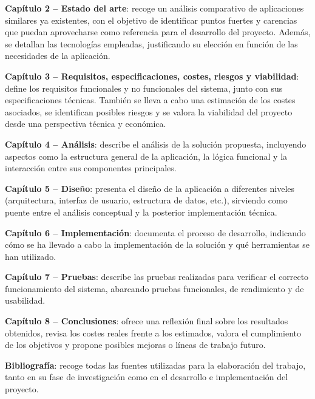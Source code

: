 \textbf{Capítulo 2 – Estado del arte}: recoge un análisis comparativo de aplicaciones similares ya existentes, con el objetivo de identificar puntos fuertes y carencias que puedan aprovecharse como referencia para el desarrollo del proyecto. Además, se detallan las tecnologías empleadas, justificando su elección en función de las necesidades de la aplicación.

\textbf{Capítulo 3 – Requisitos, especificaciones, costes, riesgos y viabilidad}: define los requisitos funcionales y no funcionales del sistema, junto con sus especificaciones técnicas. También se lleva a cabo una estimación de los costes asociados, se identifican posibles riesgos y se valora la viabilidad del proyecto desde una perspectiva técnica y económica.

\textbf{Capítulo 4 – Análisis}: describe el análisis de la solución propuesta, incluyendo aspectos como la estructura general de la aplicación, la lógica funcional y la interacción entre sus componentes principales.

\textbf{Capítulo 5 – Diseño}: presenta el diseño de la aplicación a diferentes niveles (arquitectura, interfaz de usuario, estructura de datos, etc.), sirviendo como puente entre el análisis conceptual y la posterior implementación técnica.

\textbf{Capítulo 6 – Implementación}: documenta el proceso de desarrollo, indicando cómo se ha llevado a cabo la implementación de la solución y qué herramientas se han utilizado.

\textbf{Capítulo 7 – Pruebas}: describe las pruebas realizadas para verificar el correcto funcionamiento del sistema, abarcando pruebas funcionales, de rendimiento y de usabilidad.

\textbf{Capítulo 8 – Conclusiones}: ofrece una reflexión final sobre los resultados obtenidos, revisa los costes reales frente a los estimados, valora el cumplimiento de los objetivos y propone posibles mejoras o líneas de trabajo futuro.

\textbf{Bibliografía}: recoge todas las fuentes utilizadas para la elaboración del trabajo, tanto en su fase de investigación como en el desarrollo e implementación del proyecto.
